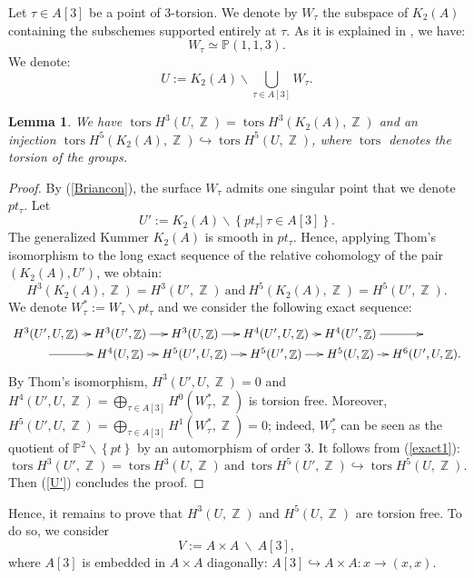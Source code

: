 \documentclass[a4paper]{article}
\newtheorem{lemme}{Lemma}
\theoremstyle{remark}
\DeclareMathOperator{\Z}{\mathbb{Z}}
\DeclareMathOperator{\tors}{tors}
\begin{document}
Let $\tau\in A[3]$ be a point of 3-torsion. We denote by $W_\tau$ the subspace of $K_2(A)$ containing the subschemes supported entirely at $\tau$. As it is explained in \cite[Section 4]{Hassett}, we have:
\begin{equation}
W_\tau\simeq \mathbb{P}(1,1,3).
\label{Briancon}
\end{equation}
We denote:
$$U:=K_2(A)\smallsetminus \bigcup_{\tau\in A[3]} W_\tau.$$
\begin{lemme}
We have $\tors H^3(U,\Z)=\tors H^3(K_2(A),\Z)$ and an injection $\tors H^5(K_2(A),\Z)\hookrightarrow\tors H^5(U,\Z)$, where $\tors$ denotes the torsion of the groups.
\end{lemme}
\begin{proof}
By (\ref{Briancon}), the surface $W_\tau$ admits one singular point that we denote $pt_\tau$. Let $$U':=K_2(A)\smallsetminus \left\{\left. pt_\tau\right|\ \tau\in A[3]\right\}.$$
The generalized Kummer $K_2(A)$ is smooth in $pt_\tau$. Hence, applying Thom's isomorphism to the long exact sequence of the relative cohomology
of the pair $(K_2(A),U')$,
we obtain:
\begin{equation}
H^3(K_2(A),\Z)=H^3(U',\Z)\ \text{and}\ H^5(K_2(A),\Z)=H^5(U',\Z).
\label{U'}
\end{equation}
We denote $W_\tau^*:=W_\tau\smallsetminus pt_\tau$ and we consider the following exact sequence:
\begin{equation}
\xymatrix@C7pt@R0pt{ H^3(U',U,\Z)\ar[r] & H^{3}(U',\Z)\ar[r] & H^{3}(U,\Z)\ar[r]&H^{4}(U',U,\Z)\ar[r] & H^{4}(U',\Z)\ar[r] & \\
\ar[r]&H^{4}(U,\Z)\ar[r]&H^{5}(U',U,\Z)\ar[r]& H^{5}(U',\Z)\ar[r] & H^{5}(U,\Z)\ar[r]&H^{6}(U',U,\Z)
.}
\label{exact1}
\end{equation}
By Thom's isomorphism, $H^3(U',U,\Z)=0$ and $H^{4}(U',U,\Z)=\bigoplus_{\tau\in A[3]}H^0(W_\tau^*,\Z)$  is torsion free.
Moreover, $H^{5}(U',U,\Z)=\bigoplus_{\tau\in A[3]}H^1(W_\tau^*,\Z)=0$; indeed, $W_\tau^*$ can be seen as the quotient of $\mathbb{P}^2\smallsetminus \left\{pt\right\}$ by an automorphism of order 3. 
It follows from (\ref{exact1}):
$$\tors H^3(U',\Z)=\tors H^3(U,\Z)\ \text{and}\ \tors H^5(U',\Z)\hookrightarrow\tors H^5(U,\Z).$$
Then (\ref{U'}) concludes the proof.
\end{proof}
Hence, it remains to prove that $H^3(U,\Z)$ and $H^5(U,\Z)$ are torsion free. 
To do so, we consider
$$V:=A\times A\ \smallsetminus\  A[3],$$
where $A[3]$ is embedded in $A\times A$ diagonally: $A[3]\hookrightarrow A\times A: x\rightarrow (x,x)$.
\end{document}
